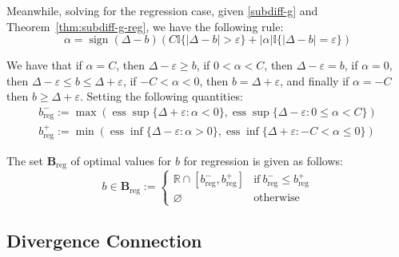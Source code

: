 \documentclass{article}
\begin{document}
Meanwhile, solving for the regression case, given \ref{subdiff-g} and Theorem~\ref{thm:subdiff-g-reg}, we have the following rule:
\begin{equation}
    \alpha = \operatorname{sign}(\Delta-b)(C\mathbb{I}\{|\Delta - b|>\varepsilon\} + |\alpha|\mathbb{I}\{|\Delta - b|=\varepsilon\})
\end{equation}

We have that if $\alpha = C$, then $\Delta - \varepsilon \geq b$, if $0 < \alpha < C$, then $\Delta - \varepsilon = b$, if $\alpha = 0$, then $\Delta - \varepsilon \leq b \leq \Delta + \varepsilon$, if $-C < \alpha < 0$, then $b = \Delta + \varepsilon$, and finally if $\alpha = -C$ then $b \geq \Delta + \varepsilon$. Setting the following quantities:
\begin{align}
    b^-_\text{reg} := \max(\operatorname{ess} \sup \{\Delta  + \varepsilon: \alpha <0\} ,\operatorname{ess} \sup \{\Delta  - \varepsilon: 0\leq\alpha <C\})\\
    b^+_\text{reg} := \min(\operatorname{ess} \inf \{\Delta  - \varepsilon: \alpha >0\} ,\operatorname{ess} \inf \{\Delta  + \varepsilon: -C <\alpha \leq  0\})
\end{align}

The set $\mathbf{B}_\text{reg}$ of optimal values for $b$ for regression is given as follows:
\begin{equation}
   b \in\mathbf{B}_\text{reg} := \begin{cases}
       \mathbb{R} \cap [ b^-_\text{reg} , b^+_\text{reg}] &\text{if} \ b^-_\text{reg} \leq b^+_\text{reg} \\
       \varnothing &\text{otherwise}
   \end{cases} 
\end{equation}


\subsection{Divergence Connection} \label{divergence-connection}
\end{document}
